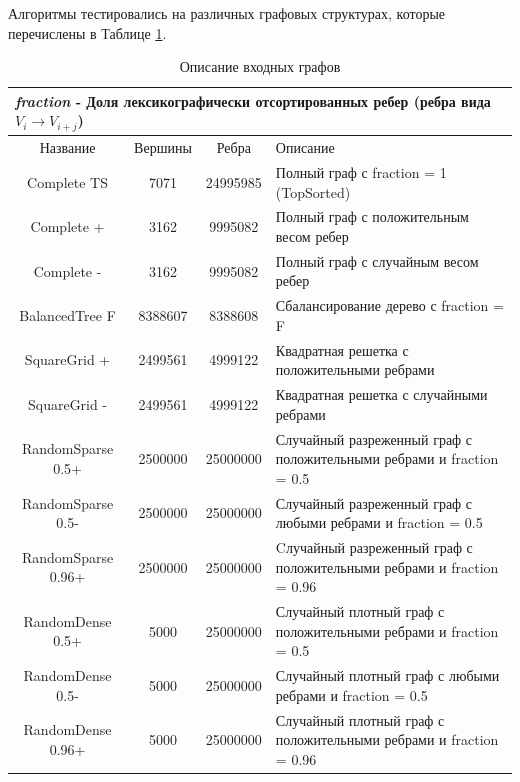 Алгоритмы тестировались на различных графовых структурах, которые перечислены в Таблице \ref{bf_algo_comparison}. 
\FloatBarrier
\begin{table}[H]
\centering
\caption{Описание входных графов}

\begin{tabular}{c | c | c | l}  
\multicolumn{4}{l}{\footnotesize \textit{fraction} - Доля лексикографически отсортированных ребер (ребра вида $V_i \rightarrow V_{i+j}$) }\\
\hline
Название & Вершины & Ребра & Описание\\
\hline\hline
Complete TS & 7071 & 24995985 & Полный граф с fraction = 1 (TopSorted)\\  
Complete + & 3162 & 9995082 & Полный граф с положительным весом ребер \\  
Complete - & 3162 & 9995082 & Полный граф с случайным весом ребер \\  
BalancedTree F & 8388607 & 8388608 & Сбалансирование дерево с fraction = F \\  
SquareGrid + & 2499561 & 4999122 & Квадратная решетка с положительными ребрами \\  
SquareGrid - & 2499561 & 4999122 & Квадратная решетка с случайными ребрами \\  
RandomSparse 0.5+ & 2500000 & 25000000 & \pbox{9cm}{Случайный разреженный граф с положительными ребрами и fraction = 0.5\\}  \\  
RandomSparse 0.5- & 2500000 & 25000000 & \pbox{9cm}{Случайный разреженный граф с любыми ребрами и fraction = 0.5\\}  \\  
RandomSparse 0.96+ & 2500000 & 25000000 & \pbox{9cm}{Cлучайный разреженный граф с положительными ребрами и fraction = 0.96\\} \\  
RandomDense 0.5+ & 5000 & 25000000 & \pbox{9cm}{Случайный плотный граф с положительными ребрами и fraction = 0.5\\}  \\  
RandomDense 0.5- & 5000 & 25000000 & \pbox{9cm}{Случайный плотный граф с любыми ребрами и fraction = 0.5\\}  \\  
RandomDense 0.96+ & 5000 & 25000000 & \pbox{9cm}{Случайный плотный граф с положительными ребрами и fraction = 0.96\\}  \\  
\hline

\end{tabular}

\label{bf_algo_comparison}
\end{table}
